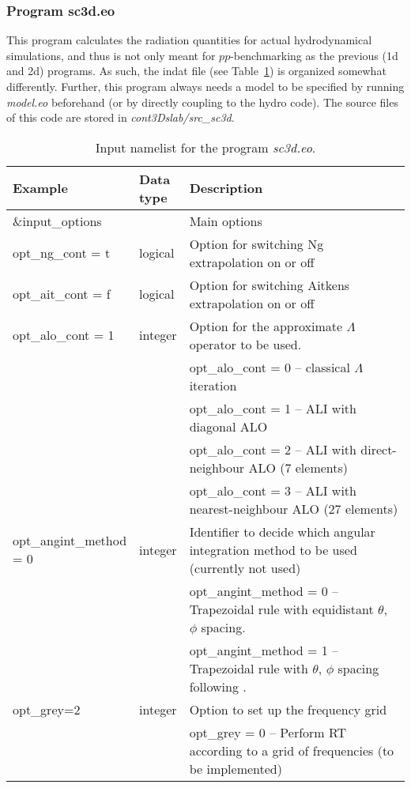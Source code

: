 \documentclass[10pt,a4paper]{article}
\begin{document}
\subsubsection{Program sc3d.eo}
This program calculates the radiation quantities for actual
hydrodynamical simulations, and thus is not only meant for
$pp$-benchmarking as the previous (1d and 2d) programs.
As such, the indat file (see Table~\ref{tab:namelist_sc3d}) is
organized somewhat differently.
Further, this program always needs a model to be specified by running
\textit{model.eo} beforehand (or by directly coupling to the hydro code).
The source files of this code are stored in
\textit{cont3Dslab/src\_sc3d}.
%
\begin{footnotesize}
\begin{longtable}[h]{p{0.24\linewidth}p{0.07\linewidth}p{0.69\linewidth}}
\caption{\normalsize Input namelist for the program \textit{sc3d.eo}.}
\label{tab:namelist_sc3d}
\\\hline\hline
Example & Data type & Description \\\hline
\&input\_options & & Main options \\
opt\_ng\_cont = t & logical &  Option for switching Ng extrapolation on or off \\
opt\_ait\_cont = f & logical &  Option for switching Aitkens extrapolation on or off\\
opt\_alo\_cont = 1 & integer & Option for the approximate $\Lambda$ operator to be used.\\
& & opt\_alo\_cont = 0 -- classical $\Lambda$ iteration \\
& & opt\_alo\_cont = 1 -- ALI with diagonal ALO \\
& & opt\_alo\_cont = 2 -- ALI with direct-neighbour ALO (7 elements) \\
& & opt\_alo\_cont = 3 -- ALI with nearest-neighbour ALO (27 elements)  \\
opt\_angint\_method = 0 & integer & Identifier to decide which angular integration method to be used (currently not used) \\
& & opt\_angint\_method = 0 -- Trapezoidal rule with equidistant $\theta$, $\phi$ spacing. \\
& & opt\_angint\_method = 1 -- Trapezoidal rule with $\theta$, $\phi$ spacing following \cite{Lobel08}. \\
opt\_grey=2 & integer & Option to set up the frequency grid \\
& & opt\_grey = 0 -- Perform RT according to a grid of frequencies (to be implemented) \\

\end{longtable}
\end{footnotesize}
\end{document}
